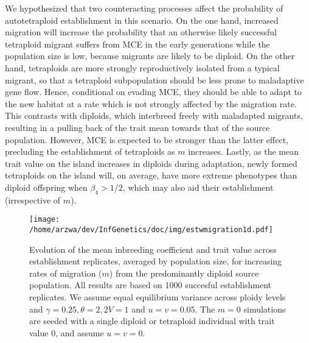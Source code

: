 \documentclass[12pt,a4paper]{article}
\begin{document}
We hypothesized that two counteracting processes affect the probability of
autotetraploid establishment in this scenario.
On the one hand, increased migration will increase the probability that an
otherwise likely successful tetraploid migrant suffers from MCE in the early
generations while the population size is low, because migrants are likely to be
diploid.
On the other hand, tetraploids are more strongly reproductively isolated from
a typical migrant, so that a tetraploid subpopulation should be less prone to
maladaptive gene flow.
Hence, conditional on evading MCE, they should be able to adapt to the new
habitat at a rate which is not strongly affected by the migration rate.
This contrasts with diploids, which interbreed freely with maladapted
migrants, resulting in a pulling back of the trait mean towards that of the
source population.
However, MCE is expected to be stronger than the latter effect,
precluding the establishment of tetraploids as $m$ increases.
Lastly, as the mean trait value on the island increases in diploids
during adaptation, newly formed tetraploids on the island will, on average,
have more extreme phenotypes than diploid offspring when $\beta_4 > 1/2$, which
may also aid their establishment (irrespective of $m$).

\begin{figure}[t]
\centering
\texttt{[image: /home/arzwa/dev/InfGenetics/doc/img/estwmigration1d.pdf]}
\caption{
    Evolution of the mean inbreeding coefficient and trait value across
    establishment replicates, averaged by population size, for increasing rates
    of migration ($m$) from the predominantly diploid source population. 
    All results are based on 1000 succesful establishment replicates.
    We assume equal equilibrium variance across ploidy levels and $\gamma=0.25,
    \theta=2, 2V=1$ and $u=v=0.05$.
    The $m=0$ simulations are seeded with a single diploid or tetraploid
    individual with trait value 0, and assume $u=v=0$.
\label{fig:estwmig2}}
\end{figure}
\end{document}
